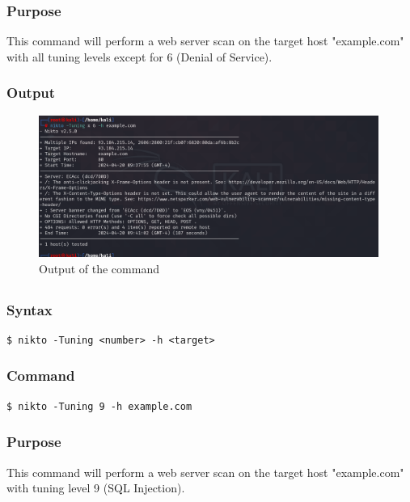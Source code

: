 \documentclass[11pt]{article}
\begin{document}
\subsubsection*{Purpose}
This command will perform a web server scan on the target host "example.com" with all tuning levels except for 6 (Denial of Service).
\subsubsection*{Output}
\begin{figure}[H]
    \centering
    \includegraphics[width=0.99\textwidth]{assignment 8 (5).png}
    \caption{Output of the command}
\end{figure}

\subsection{}

\subsubsection*{Syntax}
\begin{verbatim}
$ nikto -Tuning <number> -h <target>
\end{verbatim}

\subsubsection*{Command}
\begin{verbatim}
$ nikto -Tuning 9 -h example.com
\end{verbatim}

\subsubsection*{Purpose}
This command will perform a web server scan on the target host "example.com" with tuning level 9 (SQL Injection).
\end{document}
